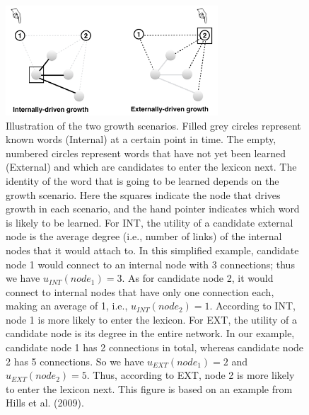 \documentclass[english,,man,floatsintext]{apa6}
\begin{document}
\begin{figure}

{\centering \includegraphics[width=300px]{figs/growth3} 

}

\caption{Illustration of the two growth scenarios. Filled grey circles represent known words (Internal) at a certain point in time. The empty, numbered circles represent words that have not yet been learned (External) and which are candidates to enter the lexicon next. The identity of the word that is going to be learned depends on the growth scenario.  Here the squares indicate the node that drives growth in each scenario, and the hand pointer indicates which word is likely to be learned. For INT, the utility of a candidate external node is the average degree (i.e., number of links) of the internal nodes that it would attach to. In this simplified example, candidate node 1 would connect to an internal node with 3 connections; thus we have $u_{INT}(node_1)= 3$. As for candidate node 2, it would connect to internal nodes that have only one connection each, making an average of 1, i.e., $u_{INT}(node_2)= 1$. According to INT, node 1 is more likely to enter the lexicon. For EXT, the utility of a candidate node is its degree in the entire network. In our example, candidate node 1 has 2 connections in total, whereas candidate node 2 has 5 connections. So we have $u_{EXT}(node_1)= 2$ and $u_{EXT}(node_2)= 5$. Thus, according to EXT, node 2 is more likely to enter the lexicon next. This figure is based on an example from Hills et al. (2009).}\label{fig:growth}
\end{figure}
\end{document}
